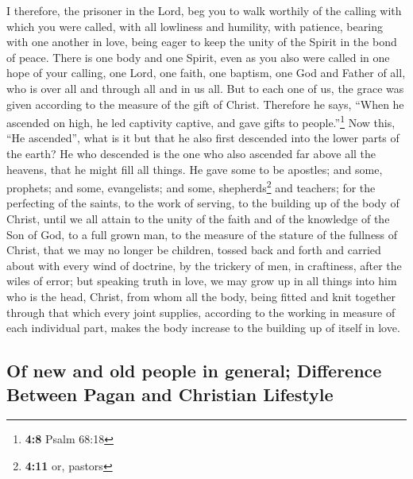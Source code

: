  I therefore, the prisoner in the Lord, beg you to walk
worthily of the calling with which you were called,  with
all lowliness and humility, with patience, bearing with one another in
love,  being eager to keep the unity of the Spirit in the
bond of peace.  There is one body and one Spirit, even as
you also were called in one hope of your calling,  one
Lord, one faith, one baptism,  one God and Father of all,
who is over all and through all and in us all.  But to
each one of us, the grace was given according to the measure of the gift
of Christ.  Therefore he says, ``When he ascended on high,
he led captivity captive, and gave gifts to people.''\footnote{\textbf{4:8}
  Psalm 68:18}  Now this, ``He ascended'', what is it but
that he also first descended into the lower parts of the earth?
 He who descended is the one who also ascended far above
all the heavens, that he might fill all things.  He gave
some to be apostles; and some, prophets; and some, evangelists; and
some, shepherds\footnote{\textbf{4:11} or, pastors} and teachers;
 for the perfecting of the saints, to the work of
serving, to the building up of the body of Christ,  until
we all attain to the unity of the faith and of the knowledge of the Son
of God, to a full grown man, to the measure of the stature of the
fullness of Christ,  that we may no longer be children,
tossed back and forth and carried about with every wind of doctrine, by
the trickery of men, in craftiness, after the wiles of error;
 but speaking truth in love, we may grow up in all things
into him who is the head, Christ,  from whom all the
body, being fitted and knit together through that which every joint
supplies, according to the working in measure of each individual part,
makes the body increase to the building up of itself in love.

\hypertarget{of-new-and-old-people-in-general-difference-between-pagan-and-christian-lifestyle}{%
\subsection{Of new and old people in general; Difference Between Pagan
and Christian
Lifestyle}\label{of-new-and-old-people-in-general-difference-between-pagan-and-christian-lifestyle}}

